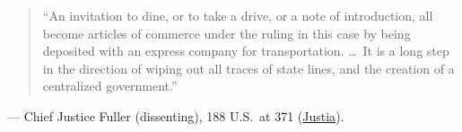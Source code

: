 \documentclass[12pt]{article}
\begin{document}
\begin{quote}
``An invitation to dine, or to take a drive, or a note of introduction, all become articles of commerce under the ruling in this case by being deposited with an express company for transportation. \dots\ It is a long step in the direction of wiping out all traces of state lines, and the creation of a centralized government.''
\end{quote}
\noindent --- Chief Justice Fuller (dissenting), 188 U.S.\ at 371 (\href{https://supreme.justia.com/cases/federal/us/188/321/}{Justia}).
\end{document}
